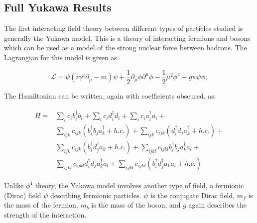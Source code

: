 \subsection{Full Yukawa Results}
\label{sec:yukawa_results}

The first interacting field theory between different types of particles studied is generally the Yukawa model.
This is a theory of interacting fermions and bosons which can be used as a model of the strong nuclear force between hadrons.
The Lagrangian for this model is given as

\begin{equation}
    \label{eq:yukawa-lagrangian}
    \mathcal{L} = \bar \psi \left(i\gamma^\mu \partial_\mu - m \right)\psi + \frac{1}{2}\partial_\mu \phi \partial^\mu \phi - \frac{1}{2}\mu^2\phi^2 - g\bar \psi \psi \phi,
\end{equation}

The Hamiltonian can be written, again with coefficients obscured, as:

\begin{align}
    \begin{split}
        H = &\sum_i c_i b_i^\dagger b_i + \sum_i c_i d_i^\dagger d_i + \sum_i c_i a_i^\dagger a_i + \\
        &\sum_{ijk}c_{ijk}\left(b_i^\dagger b_j a_k^\dagger + h.c. \right) + \sum_{ijk}c_{ijk}\left(d_i^\dagger d_j a_k^\dagger + h.c. \right) + \\
        &\sum_{ijk}c_{ijk}\left(b_i^\dagger d_j^\dagger a_k + h.c. \right) + \sum_{ijkl}c_{ijkl}b_i^\dagger b_j a_k^\dagger a_l + \\
        &\sum_{ijkl}c_{ijkl}d_i^\dagger d_j a_k^\dagger a_l + \sum_{ijkl}c_{ijkl}\left(b_i^\dagger d_j^\dagger a_k a_l + h.c. \right)
    \end{split}
\end{align}

Unlike $\phi^4$ theory, the Yukawa model involves another type of field, a fermionic (Dirac) field $\psi$ describing fermionic particles.
$\bar \psi$ is the conjugate Dirac field, $m_f$ is the mass of the fermion, $m_b$ is the mass of the boson, and $g$ again describes the strength of the interaction.